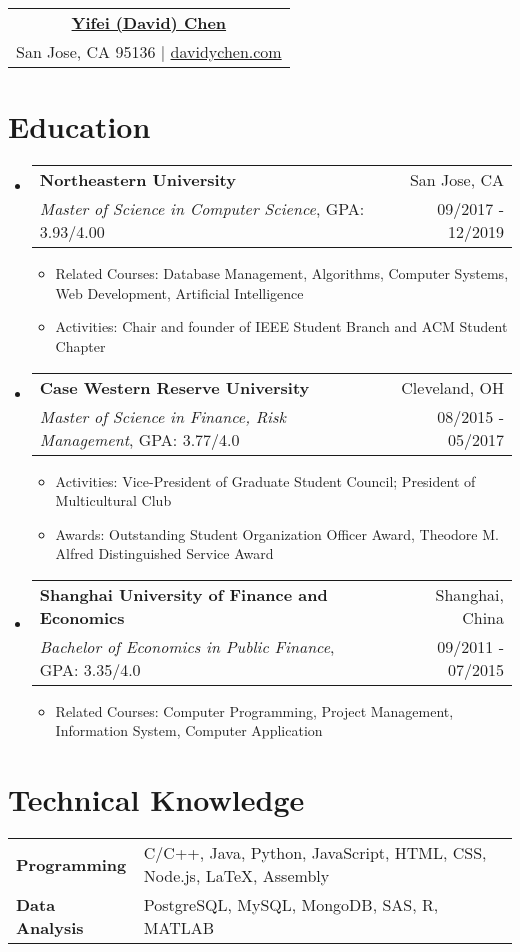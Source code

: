 \documentclass[letterpaper,11pt]{article}
\makeatletter
\newcommand{\resumeItem}[1]{
  \item\small{#1 \vspace{-2pt}}
}
\newcommand{\resumeSubheadingEdu}[5]{
  \vspace{-1pt}\item
    \begin{tabular*}{0.97\textwidth}{l@{\extracolsep{\fill}}r}
      \textbf{#1} & #2 \\
      \textit{\small#3}\small #4 & \small #5 \\
    \end{tabular*}\vspace{-5pt}
}
\newcommand{\resumeSubHeadingListStart}{\begin{itemize}[label={},leftmargin=*]}
\newcommand{\resumeSubHeadingListEnd}{\end{itemize}}
\newcommand{\resumeItemListEduStart}{\begin{itemize}[label={}]}
\newcommand{\resumeItemListEnd}{\end{itemize}\vspace{-5pt}}
\makeatother
\begin{document}
\begin{center}
\begin{tabular}{c}
  \textbf{\href{http://davidychen.com/}{\Large Yifei (David) Chen}}\\
  San Jose, CA 95136 $\vert$ \href{http://davidychen.com/}{davidychen.com}\\
\end{tabular}
\end{center}

\section{Education}
  \resumeSubHeadingListStart
    \resumeSubheadingEdu
      {Northeastern University}{San Jose, CA}
      {Master of Science in Computer Science}{, GPA: 3.93/4.00}{09/2017 - 12/2019}
      \resumeItemListEduStart
      	\resumeItem{Related Courses: Database Management, Algorithms, Computer Systems, Web Development, Artificial Intelligence}
      	\resumeItem{Activities: Chair and founder of IEEE Student Branch and ACM Student Chapter}
      \resumeItemListEnd
    \resumeSubheadingEdu
      {Case Western Reserve University}{Cleveland, OH}
      {Master of Science in Finance, Risk Management}{, GPA: 3.77/4.0}{08/2015 - 05/2017}
      \resumeItemListEduStart
      	\resumeItem{Activities: Vice-President of Graduate Student Council; President of Multicultural Club}
      	\resumeItem{Awards: Outstanding Student Organization Officer Award, Theodore M. Alfred Distinguished Service Award}
      \resumeItemListEnd
      \resumeSubheadingEdu
      {Shanghai University of Finance and Economics}{Shanghai, China}
      {Bachelor of Economics in Public Finance}{, GPA: 3.35/4.0}{09/2011 - 07/2015}
		\resumeItemListEduStart
      	\resumeItem{Related Courses: Computer Programming, Project Management, Information System, Computer Application}
		\resumeItemListEnd
  \resumeSubHeadingListEnd

\section{Technical Knowledge}
\begin{center}
\small
\begin{tabular*}{\textwidth}{l@{\hskip 2em}l}
	\textbf{Programming} & C/C++, Java, Python, JavaScript, HTML, CSS, Node.js, \LaTeX , Assembly\\
	\textbf{Data Analysis} & PostgreSQL, MySQL, MongoDB, SAS, R, MATLAB
\end{tabular*}
\end{center}
\end{document}
